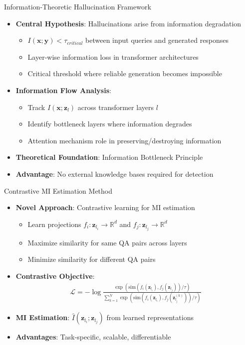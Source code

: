 \documentclass[aspectratio=169]{beamer}
\begin{document}
\begin{frame}{Information-Theoretic Hallucination Framework}
\begin{itemize}
    \item \textbf{Central Hypothesis}: Hallucinations arise from information degradation
    \begin{itemize}
        \item $I(\mathbf{x}; \mathbf{y}) < \tau_{critical}$ between input queries and generated responses
        \item Layer-wise information loss in transformer architectures
        \item Critical threshold where reliable generation becomes impossible
    \end{itemize}
    \item \textbf{Information Flow Analysis}:
    \begin{itemize}
        \item Track $I(\mathbf{x}; \mathbf{z}_l)$ across transformer layers $l$
        \item Identify bottleneck layers where information degrades
        \item Attention mechanism role in preserving/destroying information
    \end{itemize}
    \item \textbf{Theoretical Foundation}: Information Bottleneck Principle \citep{tishby2000information}
    \item \textbf{Advantage}: No external knowledge bases required for detection
\end{itemize}
\end{frame}

\begin{frame}{Contrastive MI Estimation Method}
\begin{itemize}
    \item \textbf{Novel Approach}: Contrastive learning for MI estimation
    \begin{itemize}
        \item Learn projections $f_i: \mathbf{z}_{l_i} \rightarrow \mathbb{R}^d$ and $f_j: \mathbf{z}_{l_j} \rightarrow \mathbb{R}^d$
        \item Maximize similarity for same QA pairs across layers
        \item Minimize similarity for different QA pairs
    \end{itemize}
    \item \textbf{Contrastive Objective}:
    \begin{align}
        \mathcal{L} = -\log \frac{\exp(\text{sim}(f_i(\mathbf{z}_{l_i}), f_j(\mathbf{z}_{l_j})) / \tau)}{\sum_{k=1}^{N} \exp(\text{sim}(f_i(\mathbf{z}_{l_i}), f_j(\mathbf{z}_{l_j}^{(k)})) / \tau)}
    \end{align}
    \item \textbf{MI Estimation}: $\hat{I}(\mathbf{z}_{l_i}; \mathbf{z}_{l_j})$ from learned representations
    \item \textbf{Advantages}: Task-specific, scalable, differentiable
\end{itemize}
\end{frame}
\end{document}
